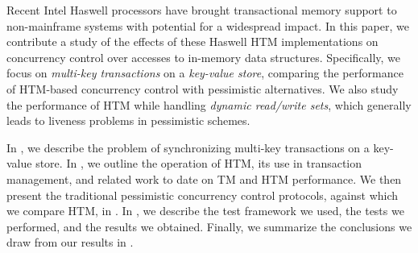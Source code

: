 Recent Intel Haswell processors have brought transactional memory support to
non-mainframe systems with potential for a widespread impact. 
In this paper, we contribute a study
of the effects of these Haswell HTM implementations on concurrency control over 
accesses to
in-memory data structures. Specifically, we focus on \textit{multi-key
  transactions} on a \textit{key-value store}, comparing the performance of
HTM-based concurrency control with pessimistic alternatives. We also study the
performance of HTM while handling \textit{dynamic read/write sets}, which
generally leads to liveness problems in pessimistic schemes.

In , we describe the problem of synchronizing multi-key
transactions on a key-value store. In , we outline the operation of
HTM, its use in transaction management, and related work to date on TM and HTM
performance. We then present the traditional pessimistic concurrency control
protocols, against which we compare HTM, in  . In
, we describe the test framework we used, the tests we performed,
and the results we obtained. Finally, we summarize the conclusions we draw from
our results in .
